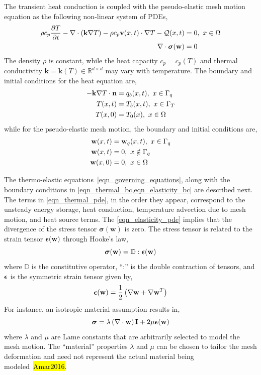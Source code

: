 The transient heat conduction is coupled with the pseudo-elastic mesh motion equation as the following non-linear system of PDEs,
\begin{subequations}
    \begin{align}
        \rho c_p\frac{\partial T}{\partial t} - \nabla\cdot (\mathbf{k}\nabla T) - \rho c_p\mathbf{v}(x,t)\cdot\nabla T - \mathcal{Q}(x,t) &= 0,\ x\in\Omega \label{eqn_thermal_pde}\\
        \nabla\cdot\boldsymbol{\sigma}(\mathbf{w}) &= 0\label{eqn_elasticity_pde}
    \end{align}\label{eqn_governing_equations}
\end{subequations}
The density $\rho$ is constant, while the heat capacity $c_p=c_p(T)$ and thermal conductivity $\mathbf{k}=\mathbf{k}(T)\in\mathbb{R}^{d\times d}$ may vary with temperature. The boundary and initial conditions for the heat equation are,
\begin{subequations}
    \begin{align}
        -\mathbf{k}\nabla T\cdot \vn &= q_b(x,t),\ x\in\Gamma_q\label{eqn_thermal_bc_neumann}\\
        T(x,t) &= T_b(x,t),\ x\in\Gamma_T\label{eqn_thermal_bc_dirichlet}\\
        T(x,0) &= T_0(x),\ x\in\Omega\label{eqn_thermal_ic}
    \end{align}\label{eqn_thermal_bc}
\end{subequations}
while for the pseudo-elastic mesh motion, the boundary and initial conditions are,
\begin{subequations}
    \begin{align}
        \mathbf{w}(x,t) &= \mathbf{w}_q(x,t),\ x\in\Gamma_q\\
        \mathbf{w}(x,t) &= 0,\ x\notin\Gamma_q\\
        \mathbf{w}(x,0) &= 0,\ x\in\Omega
    \end{align}\label{eqn_elasticity_bc}
\end{subequations}

The thermo-elastic equations~\cref{eqn_governing_equations}, along with the boundary conditions in \cref{eqn_thermal_bc,eqn_elasticity_bc} are described next. The terms in \cref{eqn_thermal_pde}, in the order they appear, correspond to the unsteady energy storage, heat conduction, temperature advection due to mesh motion, and heat source terms. The \cref{eqn_elasticity_pde} implies that the divergence of the stress tensor $\boldsymbol{\sigma}(\mathbf{w})$ is zero. The stress tensor is related to the strain tensor $\boldsymbol{\epsilon}(\mathbf{w})$ through Hooke's law,
\[
    \boldsymbol{\sigma}(\mathbf{w}) = \mathbb{D}:\boldsymbol{\epsilon}(\mathbf{w})
\]
where $\mathbb{D}$ is the constitutive operator, ``:'' is the double contraction of tensors, and $\boldsymbol{\epsilon}$ is the symmetric strain tensor given by,
\[
    \boldsymbol{\epsilon}(\mathbf{w}) = \frac{1}{2}\left(\nabla\mathbf{w} + \nabla\mathbf{w}^T\right)
\]
For instance, an isotropic material assumption results in,
\[
    \boldsymbol{\sigma} = \lambda\left(\nabla\cdot\mathbf{w}\right) \mathbf{I} + 2\mu\boldsymbol{\epsilon}(\mathbf{w})
\]
where $\lambda$ and $\mu$ are Lame constants that are arbitrarily selected to model the mesh motion. The ``material'' properties $\lambda$ and $\mu$ can be chosen to tailor the mesh deformation and need not represent the actual material being modeled~\hl{Amar2016}. 


